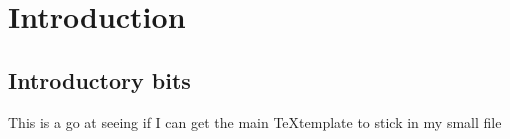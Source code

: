 \chapter{Introduction}

\section{Introductory bits}
This is a go at seeing if I can get the main \TeX template to stick in my small file
